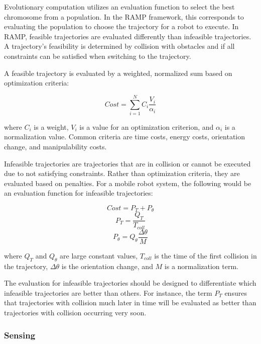 \documentclass[10pt,conference]{ieeeconf}
\begin{document}
Evolutionary computation utilizes an evaluation function to select the best chromosome from a population. In the RAMP framework, this corresponds to evaluating the population to choose the trajectory for a robot to execute. In RAMP, feasible trajectories are evaluated differently than infeasible trajectories. A trajectory's feasibility is determined by collision with obstacles and if all constraints can be satisfied when switching to the trajectory.

A feasible trajectory is evaluated by a weighted, normalized sum based on optimization criteria:

\begin{equation}
	Cost = \sum_{i=1}^{N} C_i\frac{V_i}{\alpha_i}
\end{equation}

where $C_i$ is a weight, $V_i$ is a value for an optimization criterion, and $\alpha_i$ is a normalization value. Common criteria are time costs, energy costs, orientation change, and manipulability costs.

Infeasible trajectories are trajectories that are in collision or cannot be executed due to not satisfying constraints. Rather than optimization criteria, they are evaluated based on penalties. For a mobile robot system, the following would be an evaluation function for infeasible trajectories:

\begin{equation}
Cost = P_T + P_\theta
\end{equation}
\begin{equation}
P_T = \frac{Q_T}{T_{coll}}
\end{equation}
\begin{equation}
P_\theta = Q_\theta\frac{\Delta\theta}{M}
\end{equation}

where $Q_T$ and $Q_θ$ are large constant values, $T_{coll}$ is the time
of the first collision in the trajectory, $\Delta\theta$ is the orientation change, and $M$ is a normalization term.

The evaluation for infeasible trajectories should be designed to differentiate which infeasible trajectories are better than others. For instance, the term $P_T$ ensures that trajectories with collision much later in time will be evaluated as better than trajectories with collision occurring very soon.

\subsubsection{Sensing}
\end{document}
